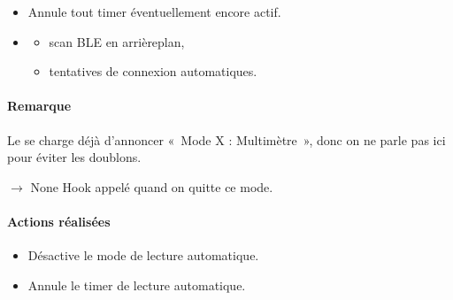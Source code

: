 \documentclass[letterpaper,10pt,french]{sphinxmanual}
\begin{document}
\begin{fulllineitems}
\begin{fulllineitems}
\begin{itemize}
\item {} 
\sphinxAtStartPar
Annule tout timer éventuellement encore actif.

\item {} \begin{description}
\begin{itemize}
\item {} 
\sphinxAtStartPar
scan BLE en arrière\sphinxhyphen{}plan,

\item {} 
\sphinxAtStartPar
tentatives de connexion automatiques.

\end{itemize}

\end{description}

\end{itemize}


\paragraph{Remarque}
\label{\detokenize{api/modes:id6}}
\sphinxAtStartPar
Le  se charge déjà d’annoncer « Mode X : Multimètre »,
donc on ne parle pas ici pour éviter les doublons.

\end{fulllineitems}


\begin{fulllineitems}
\label{\detokenize{api/modes:modes.mode_multimeter.ModeMultimetre.on_exit}}
\pysigstartsignatures
\pysiglinewithargsret
{}
{}
{{ $\rightarrow$ None}}
\pysigstopsignatures
\sphinxAtStartPar
Hook appelé quand on quitte ce mode.


\paragraph{Actions réalisées}
\label{\detokenize{api/modes:id7}}\begin{itemize}
\item {} 
\sphinxAtStartPar
Désactive le mode de lecture automatique.

\item {} 
\sphinxAtStartPar
Annule le timer de lecture automatique.


\end{itemize}
\end{fulllineitems}
\end{fulllineitems}
\end{document}
